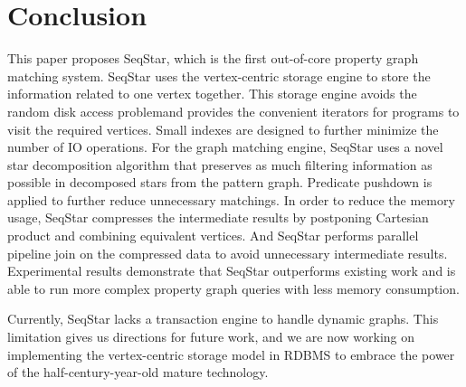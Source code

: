 \section{Conclusion}\label{sec:conclusion}
This paper proposes SeqStar, which is the first out-of-core property graph matching system.
SeqStar uses the vertex-centric storage engine to store the information related to one vertex together. 
This storage engine avoids the random disk access problemand provides the convenient iterators for programs to visit the required vertices.
Small indexes are designed to further minimize the number of IO operations.
For the graph matching engine,
SeqStar uses a novel star decomposition algorithm that preserves as much filtering information as possible in decomposed stars from the pattern graph.
Predicate pushdown is applied to further reduce unnecessary matchings.
In order to reduce the memory usage, SeqStar compresses the intermediate results by postponing Cartesian product and combining equivalent vertices.
And SeqStar performs parallel pipeline join on the compressed data to avoid unnecessary intermediate results.
Experimental results demonstrate that SeqStar outperforms existing work and is able to run more complex property graph queries with less memory consumption.


Currently, SeqStar lacks a transaction engine to handle dynamic graphs.
This limitation gives us directions for future work,
and we are now working on implementing the vertex-centric storage model in RDBMS to embrace the power of the half-century-year-old mature technology.
